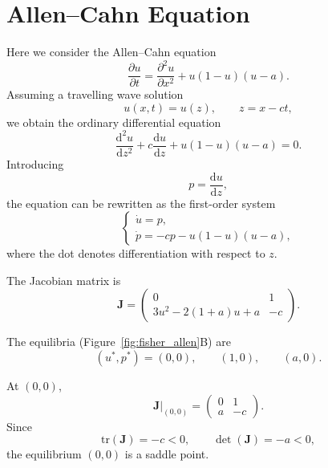 \section{Allen--Cahn Equation}

Here we consider the Allen--Cahn equation \citep{allen_coherent_1975}
\begin{equation*}
    \frac{\partial u}{\partial t}
    =
    \frac{\partial^2 u}{\partial x^2}
    +
    u(1-u)(u-a).
\end{equation*}
Assuming a travelling wave solution
\begin{equation*}
u(x,t)=u(z),
\qquad
z=x-ct,
\end{equation*}
we obtain the ordinary differential equation
\begin{equation*}
    \frac{\mathrm{d}^2u}{\mathrm{d}z^2}
    +
    c\frac{\mathrm{d}u}{\mathrm{d}z}
    +
    u(1-u)(u-a)
    =
    0.
\end{equation*}
Introducing
\begin{equation*}
p=\frac{\mathrm{d}u}{\mathrm{d}z},
\end{equation*}
the equation can be rewritten as the first-order system
\begin{equation*}
\begin{cases}
\dot{u}=p,\\
\dot{p}=-cp-u(1-u)(u-a),
\end{cases}
\end{equation*}
where the dot denotes differentiation with respect to $z$.

The Jacobian matrix is
\begin{equation*}
\mathbf{J}
=
\begin{pmatrix}
0 & 1\\
3u^2-2(1+a)u+a & -c
\end{pmatrix}.
\end{equation*}

The equilibria (Figure~\ref{fig:fisher_allen}B) are
\begin{equation*}
(u^*,p^*)=(0,0),\qquad (1,0),\qquad (a,0).
\end{equation*}

At $(0,0)$,
\begin{equation*}
\mathbf{J}|_{(0,0)}
=
\begin{pmatrix}
0 & 1\\
a & -c
\end{pmatrix}.
\end{equation*}
Since
\begin{equation*}
\mathrm{tr}(\mathbf{J})=-c<0,
\qquad
\det(\mathbf{J})=-a<0,
\end{equation*}
the equilibrium $(0,0)$ is a saddle point.

